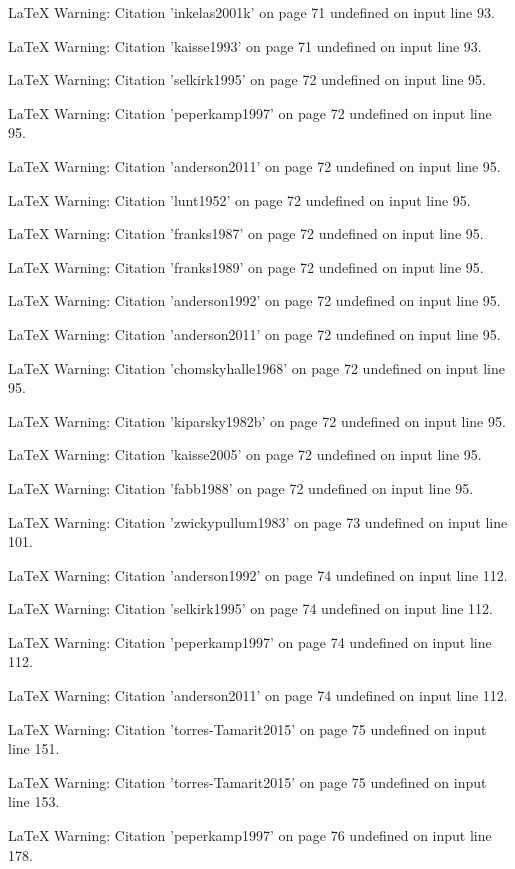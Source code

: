 LaTeX Warning: Citation 'inkelas2001k' on page 71 undefined on input line 93.


LaTeX Warning: Citation 'kaisse1993' on page 71 undefined on input line 93.


LaTeX Warning: Citation 'selkirk1995' on page 72 undefined on input line 95.


LaTeX Warning: Citation 'peperkamp1997' on page 72 undefined on input line 95.


LaTeX Warning: Citation 'anderson2011' on page 72 undefined on input line 95.


LaTeX Warning: Citation 'lunt1952' on page 72 undefined on input line 95.


LaTeX Warning: Citation 'franks1987' on page 72 undefined on input line 95.


LaTeX Warning: Citation 'franks1989' on page 72 undefined on input line 95.


LaTeX Warning: Citation 'anderson1992' on page 72 undefined on input line 95.


LaTeX Warning: Citation 'anderson2011' on page 72 undefined on input line 95.


LaTeX Warning: Citation 'chomskyhalle1968' on page 72 undefined on input line 95.


LaTeX Warning: Citation 'kiparsky1982b' on page 72 undefined on input line 95.


LaTeX Warning: Citation 'kaisse2005' on page 72 undefined on input line 95.


LaTeX Warning: Citation 'fabb1988' on page 72 undefined on input line 95.


LaTeX Warning: Citation 'zwickypullum1983' on page 73 undefined on input line 101.


LaTeX Warning: Citation 'anderson1992' on page 74 undefined on input line 112.


LaTeX Warning: Citation 'selkirk1995' on page 74 undefined on input line 112.


LaTeX Warning: Citation 'peperkamp1997' on page 74 undefined on input line 112.


LaTeX Warning: Citation 'anderson2011' on page 74 undefined on input line 112.


LaTeX Warning: Citation 'torres-Tamarit2015' on page 75 undefined on input line 151.


LaTeX Warning: Citation 'torres-Tamarit2015' on page 75 undefined on input line 153.


LaTeX Warning: Citation 'peperkamp1997' on page 76 undefined on input line 178.


